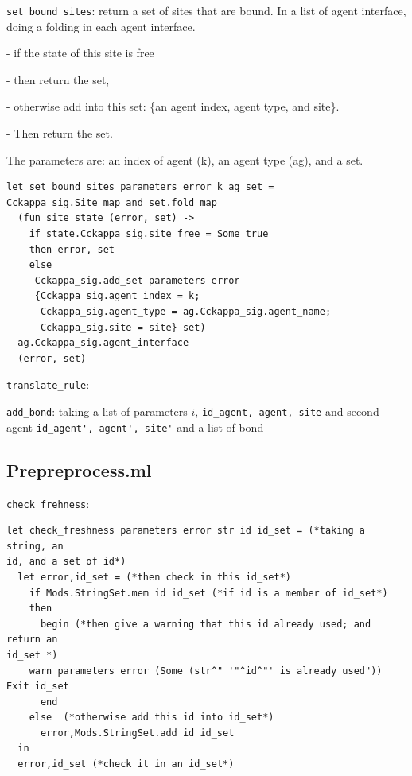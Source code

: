 \documentclass{article}
\begin{document}
\begin{i}
\item \verb|set_bound_sites|: return a set of sites that are bound. In a
  list of agent interface, doing a folding in each agent interface.

  - if the state of this site is free

  - then return the set,

  - otherwise add into this set:
  \{an agent index, agent type, and site\}.

  - Then return the set.

  The parameters are: an index of agent (k), an agent type (ag), and a set.

\begin{verbatim}
let set_bound_sites parameters error k ag set =
Cckappa_sig.Site_map_and_set.fold_map
  (fun site state (error, set) ->
    if state.Cckappa_sig.site_free = Some true
    then error, set
    else
     Cckappa_sig.add_set parameters error 
     {Cckappa_sig.agent_index = k;
      Cckappa_sig.agent_type = ag.Cckappa_sig.agent_name;
      Cckappa_sig.site = site} set)
  ag.Cckappa_sig.agent_interface
  (error, set)
\end{verbatim}

\item \verb|translate_rule|: 

\item \verb|add_bond|: taking a list of parameters $i$, 
  \verb|id_agent, agent, site| and second agent \verb|id_agent', agent', site'|
  and a list of bond

\end{i}
\subsection{Prepreprocess.ml}

\begin{i}
\item \verb|check_frehness|:

\begin{verbatim}
let check_freshness parameters error str id id_set = (*taking a string, an
id, and a set of id*)
  let error,id_set = (*then check in this id_set*)
    if Mods.StringSet.mem id id_set (*if id is a member of id_set*)
    then 
      begin (*then give a warning that this id already used; and return an
id_set *)
	warn parameters error (Some (str^" '"^id^"' is already used")) Exit id_set
      end 
    else  (*otherwise add this id into id_set*)
      error,Mods.StringSet.add id id_set
  in 
  error,id_set (*check it in an id_set*)
\end{verbatim}



\end{i}
\end{document}
